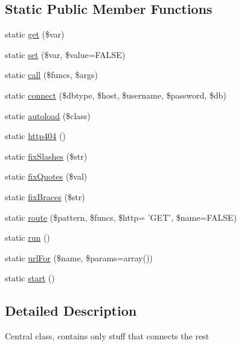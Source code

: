 \subsection*{Static Public Member Functions}
\begin{DoxyCompactItemize}
\item 
static \hyperlink{classrolisz_a0e8f3e2708d9f0c6ee7b54599f57ea34}{get} (\$var)
\item 
static \hyperlink{classrolisz_adc76e59111cb34cf88726e6f3bd0be8b}{set} (\$var, \$value=FALSE)
\item 
static \hyperlink{classrolisz_af732c33c326c863efe6dd2cccb21a9a5}{call} (\$funcs, \$args)
\item 
static \hyperlink{classrolisz_a7cee6d5c562bcb595bc9d826910d248d}{connect} (\$dbtype, \$host, \$username, \$password, \$db)
\item 
static \hyperlink{classrolisz_ab4c022bf9d3474583030f31894865182}{autoload} (\$class)
\item 
static \hyperlink{classrolisz_a6fdc4c9fc517c619d860c7e91d17b02d}{http404} ()
\item 
static \hyperlink{classrolisz_a13d0c0500b75a5bdd849a4a55ba8e2b1}{fixSlashes} (\$str)
\item 
static \hyperlink{classrolisz_a031dd360aea86d999059dbfd18687973}{fixQuotes} (\$val)
\item 
static \hyperlink{classrolisz_ab8e0e9e5ffd59108f38efefe79511c5b}{fixBraces} (\$str)
\item 
static \hyperlink{classrolisz_aafd29366ef6399da1dd079fc131d8858}{route} (\$pattern, \$funcs, \$http= 'GET', \$name=FALSE)
\item 
static \hyperlink{classrolisz_ad3a572002fd350672b531756f7306e8f}{run} ()
\item 
static \hyperlink{classrolisz_a2c24b81993e81c6401edd6c4caff0336}{urlFor} (\$name, \$params=array())
\item 
static \hyperlink{classrolisz_a146085d0f3a9d17bdcd7f3d4081d8c0d}{start} ()
\end{DoxyCompactItemize}


\subsection{Detailed Description}
Central class, contains only stuff that connects the rest 

